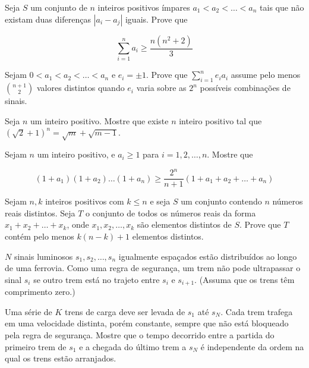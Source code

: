 \begin{questao}
  Seja $S$ um conjunto de $n$ inteiros positivos ímpares $a_1 < a_2 < \ldots <
  a_n$ tais que não existam duas diferenças $|a_i-a_j|$ iguais. Prove que

  $$ \sum_{i=1}^{n}{a_i} \geq \frac{n(n^2+2)}{3} $$
\end{questao}

\begin{questao}
  Sejam $0<a_1<a_2<\ldots<a_n$ e $e_i= \pm 1$. Prove que $\sum_{i=1}^{n}{e_i
    a_i}$ assume pelo menos $\binom{n+1}{2}$ valores distintos quando $e_i$
  varia sobre as $2^n$ possíveis combinações de sinais.
\end{questao}

\begin{questao}
  Seja $n$ um inteiro positivo. Mostre que existe $n$ inteiro positivo tal que
  $(\sqrt{2}+1)^n = \sqrt{m}+\sqrt{m-1}$.
\end{questao}

\begin{questao}
  Sejam $n$ um inteiro positivo, e $a_i \geq 1$ para $i=1,2,\ldots,n$. Mostre
  que

  $$(1+a_1)(1+a_2)\ldots(1+a_n) \geq \frac{2^n}{n+1}(1+a_1+a_2+\ldots+a_n)$$
\end{questao}

\begin{questao}
  Sejam $n,k$ inteiros positivos com $k \leq n$ e seja $S$ um conjunto contendo
  $n$ números reais distintos. Seja $T$ o conjunto de todos os números reais da
  forma $x_1+x_2+\ldots+x_k$, onde $x_1,x_2,\ldots,x_k$ são elementos distintos
  de $S$. Prove que $T$ contém pelo menos $k(n-k)+1$ elementos distintos.
\end{questao}

\begin{questao}
  $N$ sinais luminosos $s_1,s_2,\ldots,s_n$ igualmente espaçados estão
  distribuídos ao longo de uma ferrovia. Como uma regra de segurança, um trem
  não pode ultrapassar o sinal $s_i$ se outro trem está no trajeto entre $s_i$ e
  $s_{i+1}$. (Assuma que os trens têm comprimento zero.)

  Uma série de $K$ trens de carga deve ser levada de $s_1$ até $s_N$. Cada trem
  trafega em uma velocidade distinta, porém constante, sempre que não está
  bloqueado pela regra de segurança. Mostre que o tempo decorrido entre a
  partida do primeiro trem de $s_1$ e a chegada do último trem a $s_N$ é
  independente da ordem na qual os trens estão arranjados.
\end{questao}

